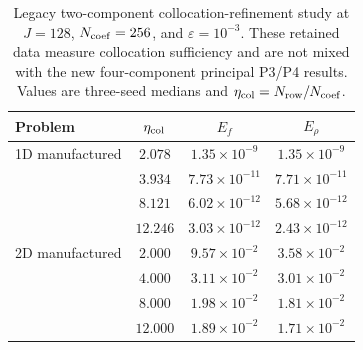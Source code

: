 \begin{table}[t]
\centering
\caption{Legacy two-component collocation-refinement study at $J=128$, $N_{\rm coef}=256$, and $\varepsilon=10^{-3}$. These retained data measure collocation sufficiency and are not mixed with the new four-component principal P3/P4 results. Values are three-seed medians and $\eta_{\rm col}=N_{\rm row}/N_{\rm coef}$.}
\label{tab:collocation}
\begin{tabular}{lccc}
\toprule
Problem & $\eta_{\rm col}$ & $E_f$ & $E_\rho$\\
\midrule
1D manufactured & $2.078$ & $1.35\times10^{-9}$ & $1.35\times10^{-9}$\\
 & $3.934$ & $7.73\times10^{-11}$ & $7.71\times10^{-11}$\\
 & $8.121$ & $6.02\times10^{-12}$ & $5.68\times10^{-12}$\\
 & $12.246$ & $3.03\times10^{-12}$ & $2.43\times10^{-12}$\\
\midrule
2D manufactured & $2.000$ & $9.57\times10^{-2}$ & $3.58\times10^{-2}$\\
 & $4.000$ & $3.11\times10^{-2}$ & $3.01\times10^{-2}$\\
 & $8.000$ & $1.98\times10^{-2}$ & $1.81\times10^{-2}$\\
 & $12.000$ & $1.89\times10^{-2}$ & $1.71\times10^{-2}$\\
\bottomrule
\end{tabular}
\end{table}

